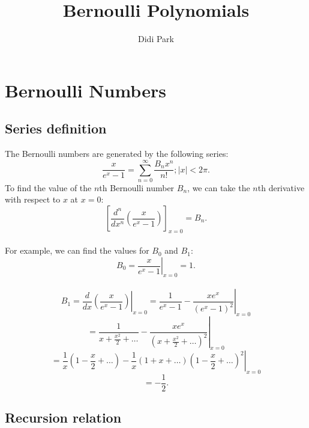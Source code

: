 \documentclass[11pt]{amsart}
\title{Bernoulli Polynomials}
\author{Didi Park}
\begin{document}
\maketitle
\section{Bernoulli Numbers}
\subsection{Series definition}
The Bernoulli numbers are generated by the following series:\\
$$\frac{x}{e^x-1}=\sum_{n=0}^\infty \frac{B_n x^n}{n!}; |x|<2\pi.$$
To find the value of the $n$th Bernoulli number $B_n$, we can take the $n$th derivative with respect to $x$ at $x=0$:\\
$$\left[ \frac{d^n}{dx^n}(\frac{x}{e^x-1}) \right]_{x=0} =B_n.$$\\
For example, we can find the values for $B_0$ and $B_1$:\\
$$\left. B_0=\frac{x}{e^x-1} \right|_{x=0} = 1.$$\\
$$B_1= \left. \frac{d}{dx}(\frac{x}{e^x-1})\right|_{x=0}
= \left. \frac{1}{e^x-1}-\frac{xe^x}{(e^x-1)^2}\right|_{x=0}$$
$$=\left. \frac{1}{x+\frac{x^2}{2}+\dots}-\frac{xe^x}{(x+\frac{x^2}{2}+\dots)^2} \right|_{x=0}$$
$$=\left. \frac{1}{x}(1-\frac{x}{2}+\dots)-\frac{1}{x}(1+x+\dots)(1-\frac{x}{2}+\dots)^2 \right|_{x=0}$$
$$=-\frac{1}{2}.$$

\subsection{Recursion relation}


\end{document}
